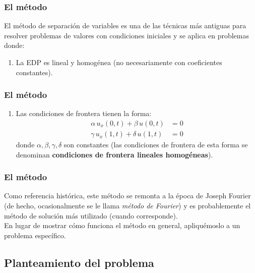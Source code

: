\documentclass[12pt]{beamer}
\begin{document}
\begin{frame}
\frametitle{El método}
El método de separación de variables es una de las técnicas más antiguas para resolver problemas de valores con condiciones iniciales y se aplica en problemas donde:
\pause
{}
\begin{enumerate}
\item La EDP es lineal y homogénea (no necesariamente con coeficientes constantes).
\seti
\end{enumerate}
\end{frame}
\begin{frame}
\frametitle{El método}
\begin{enumerate}
\conti
\item Las condiciones de frontera tienen la forma:
\begin{align*}
\alpha \, u_{x} (0, t) + \beta \, u(0, t) &= 0 \\
\gamma \, u_{x} (1, t) + \delta \, u(1, t) &= 0
\end{align*}
donde $\alpha, \beta, \gamma, \delta$ son constantes (las condiciones de frontera de esta forma se denominan \textbf{condiciones de frontera lineales homogéneas}).
\end{enumerate}
\end{frame}
\begin{frame}
\frametitle{El método}
Como referencia histórica, este método se remonta a la época de Joseph Fourier (de hecho, ocasionalmente se le llama \emph{método de Fourier}) y es probablemente el método de solución más utilizado (cuando corresponde).
\\
\bigskip
\pause
En lugar de mostrar cómo funciona el método en general, apliquémoslo a un problema específico.
\end{frame}

\subsection{Planteamiento del problema}
\end{document}
